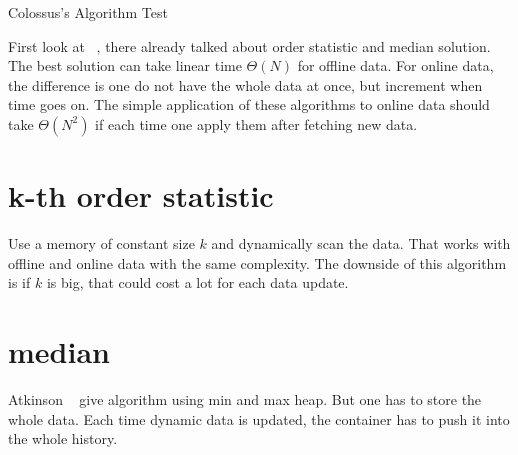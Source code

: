 \documentclass[a4paper,10pt]{article}
\begin{document}
\begin{center}
Colossus's Algorithm Test 
\end{center}

First look at ~\cite{THOMAS}, there already talked about order statistic and median solution. The best solution can take linear time $\Theta(N)$ for offline data. For online data, the difference is one do not have the whole data at once, but increment when time goes on. The simple application of these algorithms to online data should take $\Theta(N^2)$ if each time one apply them after fetching new data. 
\section{k-th order statistic}
Use a memory of constant size $k$ and dynamically scan the data. That works with offline and online data with the same complexity. The downside of this algorithm is if $k$ is big, that could cost a lot for each data update. 
\section{median}
Atkinson ~\cite{ATKINSON186} give algorithm using min and max heap. But one has to store the whole data. Each time dynamic data is updated, the container has to push it into the whole history.
 


\end{document}

